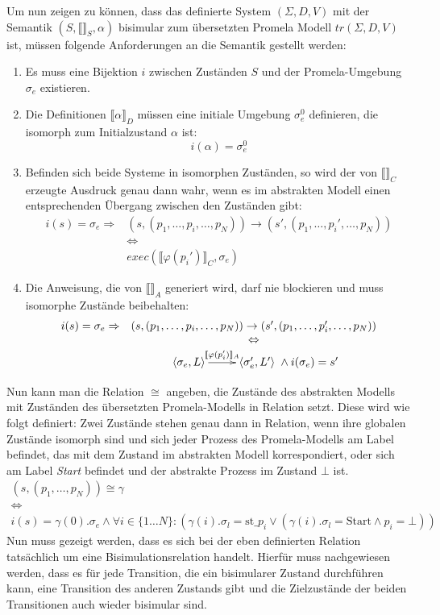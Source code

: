 Um nun zeigen zu können, dass das definierte System $(\Sigma,D,V)$ mit der Semantik $(S,\llbracket \rrbracket_S,\alpha)$ bisimular zum übersetzten Promela Modell $tr(\Sigma,D,V)$ ist, müssen folgende Anforderungen an die Semantik gestellt werden:
\begin{enumerate}
\item Es muss eine Bijektion $i$ zwischen Zuständen $S$ und der Promela-Umgebung $\sigma_e$ existieren.
\item Die Definitionen $\llbracket \alpha \rrbracket_D$ müssen eine initiale Umgebung $\sigma_e^0$ definieren, die isomorph zum Initialzustand $\alpha$ ist: 
  \[ i(\alpha) = \sigma_e^0 \]
\item Befinden sich beide Systeme in isomorphen Zuständen, so wird der von $\llbracket \rrbracket_C$ erzeugte Ausdruck genau dann wahr, wenn es im abstrakten Modell einen entsprechenden Übergang zwischen den Zuständen gibt:
  \[ \begin{array}{rc}
    i(s) = \sigma_e \Rightarrow &
    (s,(p_1,\dots,p_i,\dots,p_N))\rightarrow (s',(p_1,\dots,p_i',\dots,p_N)) \\
    & \Leftrightarrow\\
    & exec(\llbracket \varphi(p_i')\rrbracket_C,\sigma_e)
  \end{array} \]
\item Die Anweisung, die von $\llbracket \rrbracket_A$ generiert wird, darf nie blockieren und muss isomorphe Zustände beibehalten:
  \[ \begin{array}{rc}
    i(s) = \sigma_e \Rightarrow &
    (s,(p_1,\dots,p_i,\dots,p_N))\rightarrow (s',(p_1,\dots,p_i',\dots,p_N))\\
    & \Leftrightarrow\\
    & \xymatrix { \left<\sigma_e,L\right> \ar[r]^-{\llbracket \varphi(p_i')\rrbracket_A} & \left<\sigma_e',L'\right> } \land i(\sigma_e) = s'
  \end{array} \]
\end{enumerate}
Nun kann man die Relation $\cong$ angeben, die Zustände des abstrakten Modells mit Zuständen des übersetzten Promela-Modells in Relation setzt.
Diese wird wie folgt definiert:
Zwei Zustände stehen genau dann in Relation, wenn ihre globalen Zustände isomorph sind und sich jeder Prozess des Promela-Modells am Label befindet, das mit dem Zustand im abstrakten Modell korrespondiert, oder sich am Label \emph{Start} befindet und der abstrakte Prozess im Zustand $\bot$ ist.
\[
\begin{array}{c}
  (s,(p_1,\dots,p_N))\cong \gamma\\
  \Leftrightarrow\\
  i(s)=\gamma(0).\sigma_e \land \forall i\in\{1\dots N\}: (\gamma(i).\sigma_l = \textrm{st_}p_i \lor (\gamma(i).\sigma_l = \textrm{Start}\land p_i=\bot))
\end{array}
\]
Nun muss gezeigt werden, dass es sich bei der eben definierten Relation tatsächlich um eine Bisimulationsrelation handelt.
Hierfür muss nachgewiesen werden, dass es für jede Transition, die ein bisimularer Zustand durchführen kann, eine Transition des anderen Zustands gibt und die Zielzustände der beiden Transitionen auch wieder bisimular sind.

